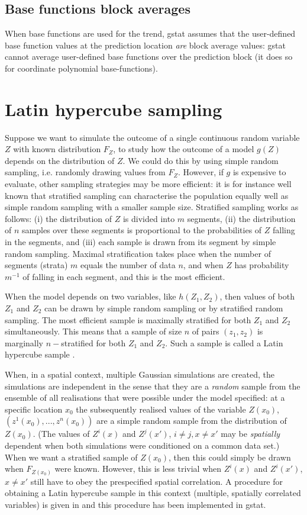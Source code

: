 \documentclass[a4paper,12pt]{book}
\renewcommand{\cite}{\citet}
\begin{document}
\subsection*{Base functions block averages}
When base functions are used for the trend, gstat assumes that the
user-defined base function values at the prediction location {\em are}
block average values: gstat cannot average user-defined base functions
over the prediction block (it does so for coordinate polynomial
base-functions).

\section{Latin hypercube sampling}
\label{sec:lhs}

Suppose we want to simulate the outcome of a single continuous random
variable $Z$ with known distribution $F_Z$, to study how the outcome of a
model $g(Z)$ depends on the distribution of $Z$. We could do this by using
simple random sampling, i.e. randomly drawing values from $F_Z$. However,
if $g$ is expensive to evaluate, other sampling strategies may be more
efficient: it is for instance well known that stratified sampling can
characterise the population equally well as simple random sampling with
a smaller sample size. Stratified sampling works as follows: (i) the
distribution of $Z$ is divided into $m$ segments, (ii) the distribution of
$n$ samples over these segments is proportional to the probabilities of
$Z$ falling in the segments, and (iii) each sample is drawn from its
segment by simple random sampling. Maximal stratification takes place
when the number of segments (strata) $m$ equals the number of data $n$,
and when $Z$ has probability $m^{-1}$ of falling in each segment, and
this is the most efficient.

When the model depends on two variables, like $h(Z_1 , Z_2)$, then
values of both $Z_1$ and $Z_2$ can be drawn by simple random sampling or
by stratified random sampling. The most efficient sample is maximally
stratified for both $Z_1$ and $Z_2$ simultaneously. This means that a
sample of size $n$ of pairs $(z_1 , z_2 )$ is marginally $n-$stratified
for both $Z_1$ and $Z_2$. Such a sample is called a Latin hypercube sample
\cite{mckay79}.

When, in a spatial context, multiple Gaussian simulations are created,
the simulations are independent in the sense that they are a {\em random}
sample from the ensemble of all realisations that were possible under the
model specified: at a specific location $x_0$ the subsequently realised
values of the variable $Z(x_0)$, $(z^1(x_0), ..., z^n (x_0))$ are a simple
random sample from the distribution of $Z(x_0)$. (The values of $Z^i(x)$
and $Z^j(x')$, $i \neq j, x \neq x'$ may be {\em spatially} dependent
when both simulations were conditioned on a common data set.) When
we want a stratified sample of $Z(x_0)$, then this could simply be
drawn when $F_{Z(x_0)}$ were known. However, this is less trivial when
$Z^i(x)$ and $Z^i(x')$, $x \neq x'$ still have to obey the prespecified
spatial correlation. A procedure for obtaining a Latin hypercube sample
in this context (multiple, spatially correlated variables) is given in
\cite{stein87} and this procedure has been implemented in gstat.
\end{document}
